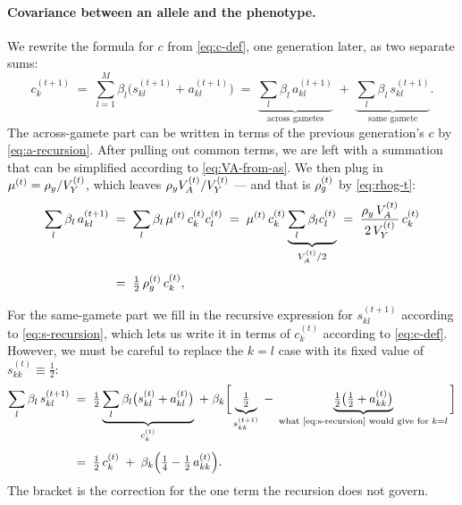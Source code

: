 \documentclass[12pt]{article}
\begin{document}
\paragraph{Covariance between an allele and the phenotype.}
We rewrite the formula for $c$ from \eqref{eq:c-def}, one generation later, as two separate sums:
\begin{equation}\label{eq:c-split}
    c^{(t+1)}_k \;=\; \sum_{l=1}^{M} \beta_l\Big(s^{(t+1)}_{kl} + a^{(t+1)}_{kl}\Big)
    \;=\; \underbrace{\sum_{l} \beta_l\,a^{(t+1)}_{kl}}_{\text{across gametes}}
    \;+\; \underbrace{\sum_{l} \beta_l\,s^{(t+1)}_{kl}}_{\text{same gamete}} .
\end{equation}
The across-gamete part can be written in terms of the previous generation's $c$ by \eqref{eq:a-recursion}.
After pulling out common terms, we are left with a summation that can be simplified according to \eqref{eq:VA-from-as}.
We then plug in $\mu^{(t)} = \rho_y/V_Y^{(t)}$, which leaves $\rho_yV_A^{(t)}/V_Y^{(t)}$ --- and that is $\rho_g^{(t)}$ by \eqref{eq:rhog-t}:
\begin{equation}\label{eq:c-part-a}
\begin{aligned}
    \sum_{l} \beta_l\,a^{(t+1)}_{kl}
    \;&=\; \sum_{l} \beta_l\,\mu^{(t)}\, c^{(t)}_k c^{(t)}_l
    \;=\; \mu^{(t)}\, c^{(t)}_k \underbrace{\sum_{l} \beta_l c^{(t)}_l}_{V_A^{(t)}/2}
    \;=\; \frac{\rho_y\,V_A^{(t)}}{2\,V_Y^{(t)}}\, c^{(t)}_k \\[4pt]
    \;&=\; \tfrac12\,\rho_g^{(t)}\, c^{(t)}_k ,
\end{aligned}
\end{equation}

For the same-gamete part we fill in the recursive expression for $s^{(t+1)}_{kl}$ according to \eqref{eq:s-recursion}, which lets us write it in terms of $c^{(t)}_k$ according to \eqref{eq:c-def}.
However, we must be careful to replace the $k=l$ case with its fixed value of $s^{(t)}_{kk} \equiv \tfrac12$:
\begin{equation}\label{eq:c-part-s}
\begin{aligned}
    \sum_{l} \beta_l\,s^{(t+1)}_{kl}
    &\;=\; \tfrac12 \underbrace{ \sum_{l} \beta_l\big(s^{(t)}_{kl} + a^{(t)}_{kl}\big)}_{c^{(t)}_k}
    \;+\; \beta_k\bigg[\underbrace{\tfrac12}_{s^{(t+1)}_{kk}} \;-\; \underbrace{\tfrac12\big(\tfrac12 + a^{(t)}_{kk}\big)}_{\text{what \eqref{eq:s-recursion} would give for } k=l}\bigg] \\[4pt]
    &\;=\; \tfrac12\,c^{(t)}_k \;+\; \beta_k\Big(\tfrac14 - \tfrac12\,a^{(t)}_{kk}\Big) .
\end{aligned}
\end{equation}
The bracket is the correction for the one term the recursion does not govern.
\end{document}
